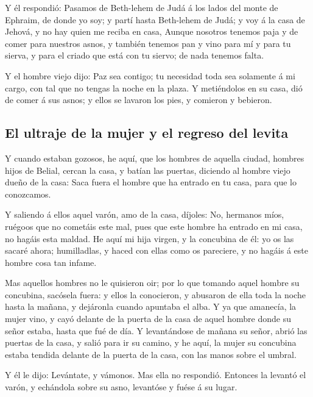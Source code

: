  Y él respondió: Pasamos de Beth-lehem de Judá á los lados
del monte de Ephraim, de donde yo soy; y partí hasta Beth-lehem de Judá;
y voy á la casa de Jehová, y no hay quien me reciba en casa,
 Aunque nosotros tenemos paja y de comer para nuestros
asnos, y también tenemos pan y vino para mí y para tu sierva, y para el
criado que está con tu siervo; de nada tenemos falta.

 Y el hombre viejo dijo: Paz sea contigo; tu necesidad toda
sea solamente á mi cargo, con tal que no tengas la noche en la plaza.
 Y metiéndolos en su casa, dió de comer á sus asnos; y
ellos se lavaron los pies, y comieron y bebieron.

\hypertarget{el-ultraje-de-la-mujer-y-el-regreso-del-levita}{%
\subsection{El ultraje de la mujer y el regreso del
levita}\label{el-ultraje-de-la-mujer-y-el-regreso-del-levita}}

 Y cuando estaban gozosos, he aquí, que los hombres de
aquella ciudad, hombres hijos de Belial, cercan la casa, y batían las
puertas, diciendo al hombre viejo dueño de la casa: Saca fuera el hombre
que ha entrado en tu casa, para que lo conozcamos.

 Y saliendo á ellos aquel varón, amo de la casa, díjoles:
No, hermanos míos, ruégoos que no cometáis este mal, pues que este
hombre ha entrado en mi casa, no hagáis esta maldad.  He
aquí mi hija virgen, y la concubina de él: yo os las sacaré ahora;
humilladlas, y haced con ellas como os pareciere, y no hagáis á este
hombre cosa tan infame.

 Mas aquellos hombres no le quisieron oir; por lo que
tomando aquel hombre su concubina, sacósela fuera: y ellos la
conocieron, y abusaron de ella toda la noche hasta la mañana, y
dejáronla cuando apuntaba el alba.  Y ya que amanecía, la
mujer vino, y cayó delante de la puerta de la casa de aquel hombre donde
su señor estaba, hasta que fué de día.  Y levantándose de
mañana su señor, abrió las puertas de la casa, y salió para ir su
camino, y he aquí, la mujer su concubina estaba tendida delante de la
puerta de la casa, con las manos sobre el umbral.

 Y él le dijo: Levántate, y vámonos. Mas ella no respondió.
Entonces la levantó el varón, y echándola sobre su asno, levantóse y
fuése á su lugar.


